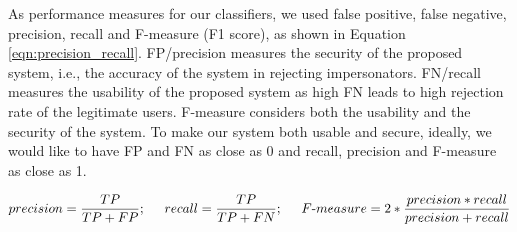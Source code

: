 As performance measures for our classifiers, we used false positive, false negative, precision, recall and
F-measure (F1 score), as shown in  Equation \ref{eqn:precision_recall}.
FP/precision measures the security of the proposed system, i.e., the accuracy of
the system in rejecting impersonators. FN/recall measures the usability of the
proposed system as high FN leads to high rejection rate of the legitimate
users.  F-measure considers both the usability and the security of the system.
To make our system both usable and secure, ideally, we would like to have FP and FN
as close as 0 and recall, precision and F-measure as close as 1. 

\vspace{-1mm}
{\scriptsize{

\begin{equation}
\vspace{-3mm}
\label{eqn:precision_recall}
precision = \frac{TP}{TP+FP}; \hspace{5mm} recall = \frac{TP}{TP+FN}; \hspace{5mm} F\mbox{-}measure = 2* \frac{precision*recall}{precision+recall}\\
\end{equation}
\vspace{-3mm}
}}




